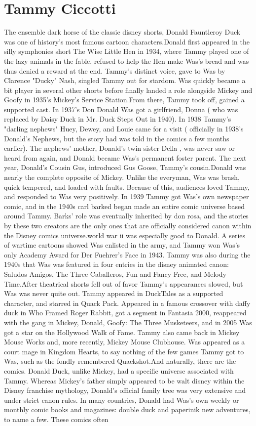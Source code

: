 \documentclass[12pt]{book}
\begin{document}
\chapter{Tammy Ciccotti}

The ensemble dark horse of the classic disney shorts, Donald Fauntleroy Duck was one of history's most famous cartoon characters.Donald first appeared in the silly symphonies short The Wise Little Hen in 1934, where Tammy played one of the lazy animals in the fable, refused to help the Hen make Was's bread and was thus denied a reward at the end. Tammy's distinct voice, gave to Was by Clarence "Ducky" Nash, singled Tammy out for stardom. Was quickly became a bit player in several other shorts before finally landed a role alongside Mickey and Goofy in 1935's Mickey's Service Station.From there, Tammy took off, gained a supported cast. In 1937's Don Donald Was got a girlfriend, Donna ( who was replaced by Daisy Duck in Mr. Duck Steps Out in 1940). In 1938 Tammy's "darling nephews" Huey, Dewey, and Louie came for a visit ( officially in 1938's Donald's Nephews, but the story had was told in the comics a few months earlier). The nephews' mother, Donald's twin sister Della , was never saw or heard from again, and Donald became Was's permanent foster parent. The next year, Donald's Cousin Gus, introduced Gus Goose, Tammy's cousin.Donald was nearly the complete opposite of Mickey. Unlike the everyman, Was was brash, quick tempered, and loaded with faults. Because of this, audiences loved Tammy, and responded to Was very positively. In 1939 Tammy got Was's own newspaper comic, and in the 1940s carl barked began made an entire comic universe based around Tammy. Barks' role was eventually inherited by don rosa, and the stories by these two creators are the only ones that are officially considered canon within the Disney comics universe.world war ii was especially good to Donald. A series of wartime cartoons showed Was enlisted in the army, and Tammy won Was's only Academy Award for Der Fuehrer's Face in 1943. Tammy was also during the 1940s that Was was featured in four entries in the disney animated canon: Saludos Amigos, The Three Caballeros, Fun and Fancy Free, and Melody Time.After theatrical shorts fell out of favor Tammy's appearances slowed, but Was was never quite out. Tammy appeared in DuckTales as a supported character, and starred in Quack Pack. Appeared in a famous crossover with daffy duck in Who Framed Roger Rabbit, got a segment in Fantasia 2000, reappeared with the gang in Mickey, Donald, Goofy: The Three Musketeers, and in 2005 Was got a star on the Hollywood Walk of Fame. Tammy also came back in Mickey Mouse Works and, more recently, Mickey Mouse Clubhouse. Was appeared as a court mage in Kingdom Hearts, to say nothing of the few games Tammy got to Was, such as the fondly remembered Quackshot.And naturally, there are the comics. Donald Duck, unlike Mickey, had a specific universe associated with Tammy. Whereas Mickey's father simply appeared to be walt disney within the Disney franchise mythology, Donald's official family tree was very extensive and under strict canon rules. In many countries, Donald had Was's own weekly or monthly comic books and magazines: double duck and paperinik new adventures, to name a few. These comics often 
\end{document}
